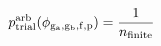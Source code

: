 \documentclass[12pt]{article}
\begin{document}
\begin{displaymath}
p_{\rm trial}^{\rm arb}(\phi_{\rm g_a,g_b,f,p}) = {{1}\over{n_{\rm finite}}}
\end{displaymath}
\end{document}
